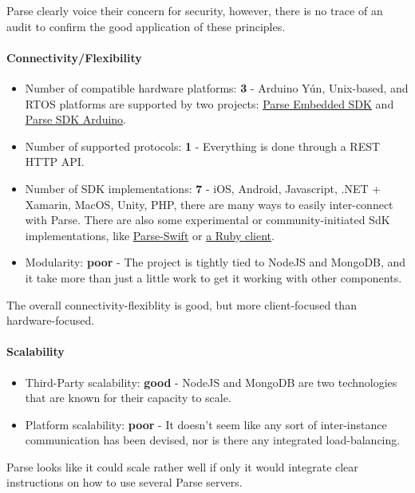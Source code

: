\documentclass{article}
\begin{document}
Parse clearly voice their concern for security, however, there is no trace of an audit to confirm the good application of these principles.

\paragraph{Connectivity/Flexibility}

\begin{itemize}
\item Number of compatible hardware platforms: \textbf{3} - Arduino Yún, Unix-based, and RTOS platforms are supported by two projects: \href{https://github.com/parse-community/parse-embedded-sdks}{Parse Embedded SDK} and \href{https://github.com/parse-community/Parse-SDK-Arduino}{Parse SDK Arduino}.
\item Number of supported protocols: \textbf{1} - Everything is done through a REST HTTP API.
\item Number of SDK implementations: \textbf{7} - iOS, Android, Javascript, .NET + Xamarin, MacOS, Unity, PHP, there are many ways to easily inter-connect with Parse. There are also some experimental or community-initiated SdK implementations, like \href{https://github.com/parse-community/Parse-Swift}{Parse-Swift} or \href{https://github.com/modernistik/parse-stack}{a Ruby client}.
\item Modularity: \textbf{poor} - The project is tightly tied to NodeJS and MongoDB, and it take more than just a little work to get it working with other components.
\end{itemize}

The overall connectivity-flexiblity is good, but more client-focused than hardware-focused.

\paragraph{Scalability}

\begin{itemize}
\item Third-Party scalability: \textbf{good} - NodeJS and MongoDB are two technologies that are known for their capacity to scale.
\item Platform scalability: \textbf{poor} - It doesn't seem like any sort of inter-instance communication has been devised, nor is there any integrated load-balancing.
\end{itemize}

Parse looks like it could scale rather well if only it would integrate clear instructions on how to use several Parse servers.
\end{document}
